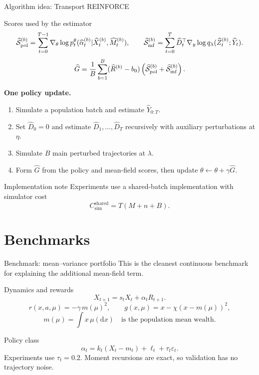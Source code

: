 \documentclass[9pt]{beamer}
\def\Sc{{\cal S}}
\def\d{{\mathrm d}}
\begin{document}
\begin{frame}{Algorithm idea: Transport REINFORCE}
\begin{block}{Scores used by the estimator}
\[
  \widehat\Sc_{\mathrm{pol}}^{(b)}
  =\sum_{t=0}^{T-1}\nabla_\theta
  \log p_t^\theta(\widehat\alpha_t^{(b)}|\widehat X_t^{(b)},\widehat M_t^{(b)}),
  \qquad
  \widehat\Sc_{\mathrm{mf}}^{(b)}
  =\sum_{t=0}^T \widehat D_t^\top
  \nabla_y\log q_\lambda(\widehat Z_t^{(b)};\widehat Y_t).
\]
\[
  \widehat G = \frac1B\sum_{b=1}^B
  (\widehat R^{(b)}-b_0)
  \left(\widehat\Sc_{\mathrm{pol}}^{(b)}+
  \widehat\Sc_{\mathrm{mf}}^{(b)}\right).
\]
\end{block}

\textbf{One policy update.}
\begin{enumerate}
  \item Simulate a population batch and estimate $\widehat Y_{0:T}$.
  \item Set $\widehat D_0=0$ and estimate $\widehat D_1,\ldots,\widehat D_T$ recursively with auxiliary perturbations at $\eta$.
  \item Simulate $B$ main perturbed trajectories at $\lambda$.
  \item Form $\widehat G$ from the policy and mean-field scores, then update $\theta\leftarrow\theta+\gamma\widehat G$.
\end{enumerate}

\begin{alertblock}{Implementation note}
Experiments use a shared-batch implementation with simulator cost
\[
  C_{\mathrm{sim}}^{\mathrm{shared}}=T(M+n+B).
\]
\end{alertblock}
\end{frame}

\section{Benchmarks}
\begin{frame}{Benchmark: mean--variance portfolio}
This is the cleanest continuous benchmark for explaining the additional mean-field term.

\begin{block}{Dynamics and rewards}
\[
  X_{t+1}=s_tX_t+\alpha_t R_{t+1}.
\]
\[
  r(x,a,\mu)=-\gamma\,m(\mu)^2,
  \qquad
  g(x,\mu)=x-\chi(x-m(\mu))^2,
\]
\[
  m(\mu)=\int x\,\mu(\d x)
  \quad\text{is the population mean wealth.}
\]
\end{block}
\begin{block}{Policy class}
\[
  \alpha_t=k_t(X_t-m_t)+\ell_t+\tau_t\varepsilon_t.
\]
Experiments use $\tau_t=0.2$. Moment recursions are exact, so validation has no trajectory noise.
\end{block}

\end{frame}
\end{document}
